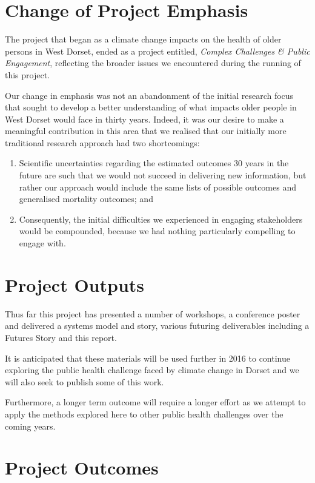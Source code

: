 \section{Change of Project Emphasis}
The project that began as a climate change impacts on the health of older persons in West Dorset, ended as a project entitled, \emph{Complex Challenges \& Public Engagement}, reflecting the broader issues we encountered during the running of this project.

Our change in emphasis was not an abandonment of the initial research focus that sought to develop a better understanding of what impacts older people in West Dorset would face in thirty years. Indeed, it was our desire to make a meaningful contribution in this area that we realised that our initially more traditional research approach had two shortcomings:
\begin{enumerate}
\item Scientific uncertainties regarding the estimated outcomes 30 years in the future are such that we would not succeed in delivering new information, but rather our approach would include the same lists of possible outcomes and generalised mortality outcomes; and
\item Consequently, the initial difficulties we experienced in engaging stakeholders would be compounded, because we had nothing particularly compelling to engage with.
\end{enumerate}

\section{Project Outputs}
Thus far this project has presented a number of workshops, a conference poster and delivered a systems model and story, various futuring deliverables including a Futures Story and this report.

It is anticipated that these materials will be used further in 2016 to continue exploring the public health challenge faced by climate change in Dorset and we will also seek to publish some of this work.

Furthermore, a longer term outcome will require a longer effort as we attempt to apply the methods explored here to other public health challenges over the coming years.

\section{Project Outcomes}

